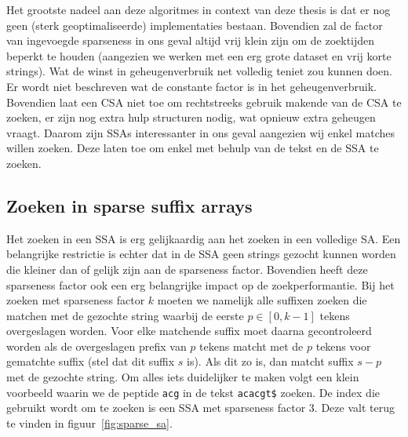 Het grootste nadeel aan deze algoritmes in context van deze thesis is dat er nog geen (sterk geoptimaliseerde) implementaties bestaan.
Bovendien zal de factor van ingevoegde sparseness in ons geval altijd vrij klein zijn om de zoektijden beperkt te houden (aangezien we werken met een erg grote dataset en vrij korte strings).
Wat de winst in geheugenverbruik net volledig teniet zou kunnen doen.
Er wordt niet beschreven wat de constante factor is in het geheugenverbruik.
Bovendien laat een CSA niet toe om rechtstreeks gebruik makende van de CSA te zoeken, er zijn nog extra hulp structuren nodig, wat opnieuw extra geheugen vraagt.
Daarom zijn SSAs interessanter in ons geval aangezien wij enkel matches willen zoeken.
Deze laten toe om enkel met behulp van de tekst en de SSA te zoeken.

\subsection{Zoeken in sparse suffix arrays}
Het zoeken in een SSA is erg gelijkaardig aan het zoeken in een volledige SA\@.
Een belangrijke restrictie is echter dat in de SSA geen strings gezocht kunnen worden die kleiner dan of gelijk zijn aan de sparseness factor.
Bovendien heeft deze sparseness factor ook een erg belangrijke impact op de zoekperformantie.
Bij het zoeken met sparseness factor $k$ moeten we namelijk alle suffixen zoeken die matchen met de gezochte string waarbij de eerste $p \in [0, k-1]$ tekens overgeslagen worden.
Voor elke matchende suffix moet daarna gecontroleerd worden als de overgeslagen prefix van $p$ tekens matcht met de $p$ tekens voor gematchte suffix (stel dat dit suffix $s$ is).
Als dit zo is, dan matcht suffix $s - p$ met de gezochte string.
Om alles iets duidelijker te maken volgt een klein voorbeeld waarin we de peptide \texttt{acg} in de tekst \texttt{acacgt\$} zoeken.
De index die gebruikt wordt om te zoeken is een SSA met sparseness factor 3.
Deze valt terug te vinden in figuur~\ref{fig:sparse_sa}.

